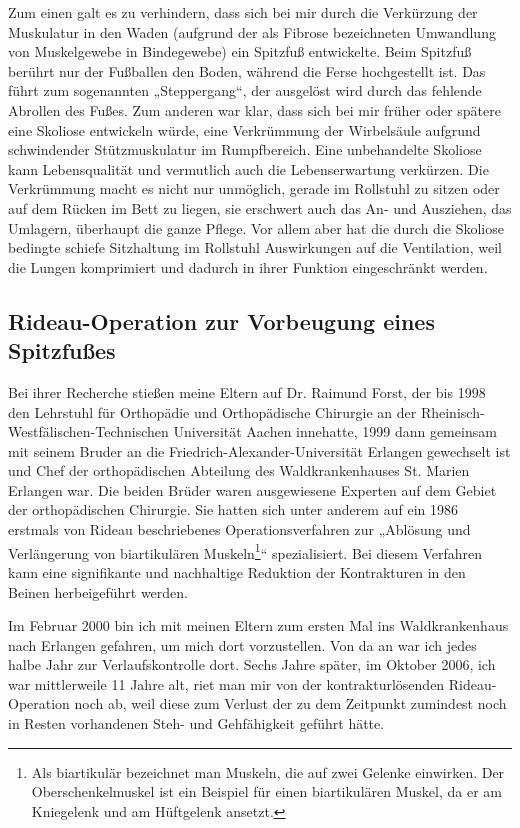 \documentclass[fontsize=14pt,a4paper,headinclude,DIV=calc,automark]{scrbook}
\begin{document}
Zum einen galt es zu verhindern, dass sich bei mir durch die Verkürzung der Muskulatur in den Waden (aufgrund der als Fibrose bezeichneten Umwandlung von Muskelgewebe in Bindegewebe) ein Spitzfuß entwickelte. Beim Spitzfuß berührt nur der Fußballen den Boden, während die Ferse hochgestellt ist. Das führt zum sogenannten „Steppergang“, der ausgelöst wird durch das fehlende Abrollen des Fußes.
Zum anderen war klar, dass sich bei mir früher oder spätere eine Skoliose entwickeln würde, eine Verkrümmung der Wirbelsäule aufgrund schwindender Stützmuskulatur im Rumpfbereich. Eine unbehandelte Skoliose kann Lebensqualität und vermutlich auch die Lebenserwartung verkürzen. Die Verkrümmung macht es nicht nur unmöglich, gerade im Rollstuhl zu sitzen oder auf dem Rücken im Bett zu liegen, sie erschwert auch das An- und Ausziehen, das Umlagern, überhaupt die ganze Pflege. Vor allem aber hat die durch die Skoliose bedingte schiefe Sitzhaltung im Rollstuhl Auswirkungen auf die Ventilation, weil die Lungen komprimiert und dadurch in ihrer Funktion eingeschränkt werden.

\subsection{Rideau-Operation zur Vorbeugung eines Spitzfußes}

Bei ihrer Recherche stießen meine Eltern auf Dr. Raimund Forst, der bis 1998 den Lehrstuhl für Orthopädie und Orthopädische Chirurgie an der Rheinisch-Westfälischen-Technischen Universität Aachen innehatte, 1999 dann gemeinsam mit seinem Bruder an die Friedrich-Alexander-Universität Erlangen gewechselt ist und Chef der orthopädischen Abteilung des Waldkrankenhauses St. Marien Erlangen war. Die beiden Brüder waren ausgewiesene Experten auf dem Gebiet der orthopädischen Chirurgie. Sie hatten sich unter anderem auf ein 1986 erstmals von Rideau beschriebenes Operationsverfahren zur „Ablösung und Verlängerung von biartikulären Muskeln\footnote{Als biartikulär bezeichnet man Muskeln, die auf zwei Gelenke einwirken. Der Oberschenkelmuskel ist ein Beispiel für einen biartikulären Muskel, da er am Kniegelenk und am Hüftgelenk ansetzt.}“ spezialisiert. Bei diesem Verfahren kann eine signifikante und nachhaltige Reduktion der Kontrakturen in den Beinen herbeigeführt werden.

Im Februar 2000 bin ich mit meinen Eltern zum ersten Mal ins Waldkrankenhaus nach Erlangen gefahren, um mich dort vorzustellen. Von da an war ich jedes halbe Jahr zur Verlaufskontrolle dort. Sechs Jahre später, im Oktober 2006, ich war mittlerweile 11 Jahre alt, riet man mir von der kontrakturlösenden Rideau-Operation noch ab, weil diese zum Verlust der zu dem Zeitpunkt zumindest noch in Resten vorhandenen Steh- und Gehfähigkeit geführt hätte.
\end{document}
